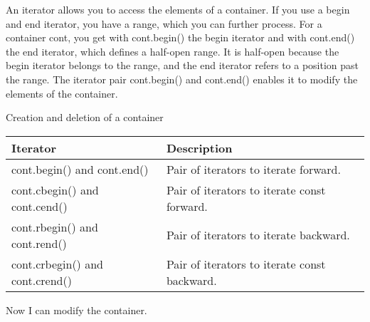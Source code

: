 An iterator allows you to access the elements of a container. If you use a begin and end iterator, you have a range, which you can further process. For a container cont, you get with cont.begin() the begin iterator and with cont.end() the end iterator, which defines a half-open range. It is half-open because the begin iterator belongs to the range, and the end iterator refers to a position past the range. The iterator pair cont.begin() and cont.end() enables it to modify the elements of the container.

\begin{center}
Creation and deletion of a container
\end{center}

\begin{longtable}[c]{|l|l|}
\hline
\textbf{Iterator}               & \textbf{Description}                         \\ \hline
\endfirsthead
%
\endhead
%
cont.begin() and cont.end()     & Pair of iterators to iterate forward.        \\ \hline
cont.cbegin() and cont.cend()   & Pair of iterators to iterate const forward.  \\ \hline
cont.rbegin() and cont.rend()   & Pair of iterators to iterate backward.       \\ \hline
cont.crbegin() and cont.crend() & Pair of iterators to iterate const backward. \\ \hline
\end{longtable}

Now I can modify the container.


